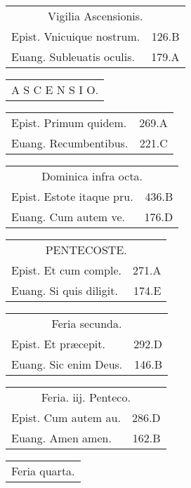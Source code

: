 \documentclass[a5paper,10pt]{book}
\def\ae{æ}
\begin{document}
\begin{multicols}{2}
\begin{tabular}{l r}
\end{tabular}
\begin{tabular}{l r}
\multicolumn{2}{c}{\color{red} Vigilia Ascensionis.}\\
Epist. Vnicuique nostrum. & 126.B\\
Euang. Subleuatis oculis. & 179.A\\
\end{tabular}
\par
\begin{tabular}{c}
\color{red} \large A S C E N S I O.\\
\end{tabular}
\par
\begin{tabular}{l r}
Epist. Primum quidem. & 269.A\\
Euang. Recumbentibus. & 221.C\\
\end{tabular}
\begin{tabular}{l r}
\multicolumn{2}{c}{\color{red} Dominica infra octa.}\\
Epist. Estote itaque pru. & 436.B\\
Euang. Cum autem ve. & 176.D\\
\end{tabular}
\begin{tabular}{l r}
\multicolumn{2}{c}{\color{red} \large PENTECOSTE.}\\
Epist. Et cum comple. & 271.A\\
Euang. Si quis diligit. & 174.E\\
\end{tabular}
\begin{tabular}{l r}
\multicolumn{2}{c}{\color{red} Feria secunda.}\\
Epist. Et pr\ae cepit. & 292.D\\
Euang. Sic enim Deus. & 146.B\\
\end{tabular}
\begin{tabular}{l r}
\multicolumn{2}{c}{\color{red} Feria. iij. Penteco.}\\
Epist. Cum autem au. & 286.D\\
Euang. Amen amen. & 162.B\\
\end{tabular}
\begin{tabular}{l r}
\multicolumn{2}{c}{\color{red} Feria quarta.}\\

\end{tabular}
\end{multicols}
\end{document}
